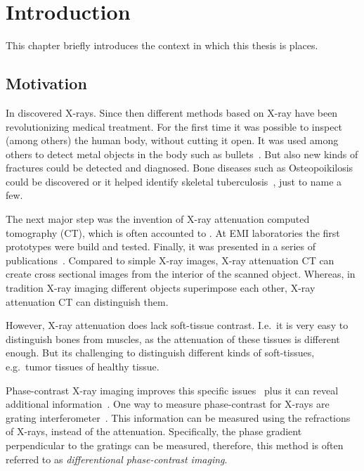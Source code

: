 \chapter{Introduction}\label{chap:introduction}

This chapter briefly introduces the context in which this thesis is places.

\section{Motivation}\label{chap:Motivation}

In \citeyear{rontgen_uber_1895} \citeauthor{rontgen_uber_1895} discovered X-rays. Since then
different methods based on X-ray have been revolutionizing medical treatment. For the first time it
was possible to inspect (among others) the human body, without cutting it open. It was used among
others to detect metal objects in the body such as bullets~\cite{haygood_skeletal_1996}. But also
new kinds of fractures could be detected and diagnosed. Bone diseases such as Osteopoikilosis could
be discovered or it helped identify skeletal tuberculosis~\cite{haygood_skeletal_1996}, just to
name a few.

The next major step was the invention of X-ray attenuation computed tomography (CT), which is often
accounted to \citeauthor{hounsfield_computerized_1973}. At EMI laboratories the first prototypes
were build and tested. Finally, it was presented in a series of
publications~\cite{hounsfield_computerized_1973,ambrose_computerized_1973, perry_computerized_1973}.
Compared to simple X-ray images, X-ray attenuation CT can create cross sectional images from the
interior of the scanned object. Whereas, in tradition X-ray imaging different objects superimpose
each other, X-ray attenuation CT can distinguish them.

However, X-ray attenuation does lack soft-tissue contrast. I.e.\ it is very easy to distinguish
bones from muscles, as the attenuation of these tissues is different enough. But its challenging to
distinguish different kinds of soft-tissues, e.g.\ tumor tissues of healthy tissue.

Phase-contrast X-ray imaging improves this specific issues~\cite{lewis_medical_2004} plus it can
reveal additional information~\cite{hahn_numerical_2012}. One way to measure phase-contrast for
X-rays are grating interferometer~\cite{pfeiffer_hard-x-ray_2008}. This information can be measured
using the refractions of X-rays, instead of the attenuation. Specifically, the phase gradient
perpendicular to the gratings can be measured, therefore, this method is often referred to as
\textit{differentional phase-contrast imaging}.

